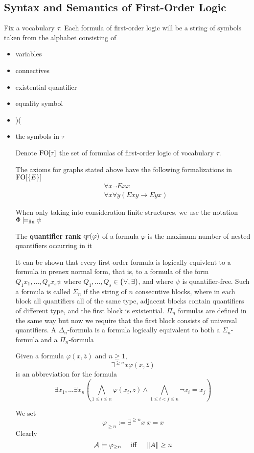\documentclass[11pt]{article}
\begin{document}
\subsection{Syntax and Semantics of First-Order Logic}
\label{sec:org42013f0}
Fix a vocabulary \(\tau\). Each formula of first-order logic will be a string of symbols taken from the
alphabet consisting of
\begin{itemize}
\item variables
\item connectives
\item existential quantifier
\item equality symbol
\item )(
\item the symbols in \(\tau\)

Denote \(\text{FO}[\tau]\) the set of formulas of first-order logic of vocabulary
\(\tau\).

The axioms for graphs stated above have the following formalizations in \(\text{FO}[\{E\}]\)
\begin{align*}
&\forall x\neg Exx\\
&\forall x\forall y(Exy\to Eyx)
\end{align*}

When only taking into consideration finite structures, we use the notation
\(\Phi\models_{\operatorname{fin}}\psi\)

The \textbf{quantifier rank} \(\operatorname{qr}(\varphi)\) of a formula \(\varphi\) is the maximum
number of nested quantifiers occurring in it

It can be shown that every first-order formula is logically equivlent to a
formula in prenex normal form, that is, to a formula of the form
\(Q_1x_1,\dots,Q_sx_s\psi\) where \(Q_1,\dots,Q_s\in\{\forall,\exists\}\),
and where \(\psi\) is quantifier-free. Such a formula is called \(\Sigma_n\) if
the string of \(n\) consecutive blocks, where in each block all quantifiers
all of the same type, adjacent blocks contain quantifiers of different type,
and the first block is existential. \(\Pi_n\) formulas are defined in the
same way but now we require that the first block consists of universal
quantifiers. A \(\Delta_n\)-formula is a formula logically equivalent to
both a \(\Sigma_n\)-formula and a \(\Pi_n\)-formula

Given a formula \(\varphi(x,\overbar{z})\) and \(n\ge1\),
\begin{equation*}
\exists^{\ge n}x\varphi(x,\overbar{z})
\end{equation*}
is an abbreviation for the formula
\begin{equation*}
\exists x_1,\dots\exists x_n(
\bigwedge_{1\le i\le n}\varphi(x_i,\overbar{z})\wedge
\bigwedge_{1\le i<j\le n}\neg x_i=x_j)
\end{equation*}

We set
\begin{equation*}
\varphi_{\ge n}:=\exists^{\ge n}x\;x=x
\end{equation*}
Clearly
\begin{equation*}
\mathcal{A}\models\varphi_{\ge n}\quad\text{ iff }\quad\left\lVert A\right\rVert\ge n
\end{equation*}
\end{itemize}
\end{document}
